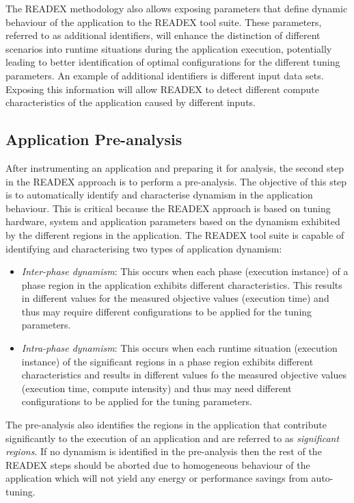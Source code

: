 The READEX methodology also allows exposing parameters that define dynamic behaviour of the application to the READEX tool suite. These parameters, referred to as additional identifiers, will enhance the distinction of different scenarios into runtime situations during the application execution, potentially leading to better identification of optimal configurations for the different tuning parameters. An example of additional identifiers is different input data sets. Exposing this information will allow READEX to detect different compute characteristics of the application caused by different inputs.

\subsection{Application Pre-analysis}
\label{sec:dynamism_detection}
After instrumenting an application and preparing it for analysis, the second step in the READEX approach is to perform a pre-analysis. The objective of this step is to automatically identify and characterise dynamism in the application behaviour. This is critical because the READEX approach is based on tuning hardware, system and application parameters based on the dynamism exhibited by the different regions in the application. The READEX tool suite is capable of identifying and characterising two types of application dynamism:
\begin{itemize}
  \item \textit{Inter-phase dynamism}: This occurs when each phase (execution instance) of a phase region in the application exhibits different characteristics. This results in different values for the measured objective values (execution time) and thus may require different configurations to be applied for the tuning parameters.
  \item \textit{Intra-phase dynamism}: This occurs when each runtime situation (execution instance) of the significant regions in a phase region exhibits different characteristics and results in different values fo the measured objective values (execution time, compute intensity) and thus may need different configurations to be applied for the tuning parameters.
\end{itemize}
The pre-analysis also identifies the regions in the application that contribute significantly to the execution of an application and are referred to as \textit{significant regions}. If no dynamism is identified in the pre-analysis then the rest of the READEX steps should be aborted due to homogeneous behaviour of the application which will not yield any energy or performance savings from auto-tuning.

